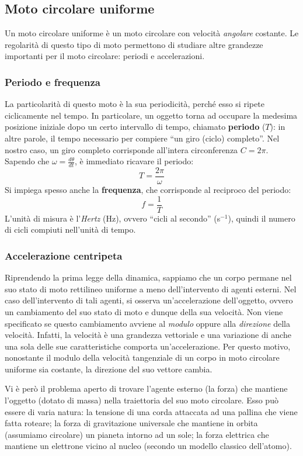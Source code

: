 \subsection{Moto circolare uniforme}
Un moto circolare uniforme è un moto circolare con velocità \textit{angolare} costante.
Le regolarità di questo tipo di moto permettono di studiare altre grandezze
importanti per il moto circolare: periodi e accelerazioni.

\subsubsection*{Periodo e frequenza}
La particolarità di questo moto è la sua periodicità, perché esso si ripete
ciclicamente nel tempo. In particolare, un oggetto torna ad occupare la medesima
posizione iniziale dopo un certo intervallo di tempo, chiamato \textbf{periodo} ($T$):
in altre parole, il tempo necessario per compiere ``un giro (ciclo) completo''.
Nel nostro caso, un giro completo corrisponde all'intera circonferenza $C = 2\pi$.
Sapendo che $\omega = \frac{d\theta}{dt}$, è immediato ricavare il periodo:
\[ T = \frac{2\pi}{\omega} \]
Si impiega spesso anche la \textbf{frequenza}, che corrisponde al reciproco
del periodo:
\[ f = \frac{1}{T} \]
L'unità di misura è l'\textit{Hertz} (Hz), ovvero ``cicli al secondo'' (s$^{-1}$),
quindi il numero di cicli compiuti nell'unità di tempo.

\subsubsection*{Accelerazione centripeta}
Riprendendo la prima legge della dinamica, sappiamo che un corpo permane nel
suo stato di moto rettilineo uniforme a meno dell'intervento di agenti esterni.
Nel caso dell'intervento di tali agenti, si osserva un'accelerazione
dell'oggetto, ovvero un cambiamento del suo stato di moto e dunque della sua
velocità. Non viene specificato se questo cambiamento avviene al \textit{modulo}
oppure alla \textit{direzione} della velocità. Infatti, la velocità è una
grandezza vettoriale e una variazione di anche una sola delle sue caratteristiche
comporta un'accelerazione. Per questo motivo, nonostante il modulo della velocità
tangenziale di un corpo in moto circolare uniforme sia costante, la direzione
del suo vettore cambia.

Vi è però il problema aperto di trovare l'agente esterno (la forza) che
mantiene l'oggetto (dotato di massa) nella traiettoria del suo moto circolare.
Esso può essere di varia natura: la tensione di una corda attaccata ad una
pallina che viene fatta roteare; la forza di gravitazione universale che
mantiene in orbita (assumiamo circolare) un pianeta intorno ad un sole; la forza
elettrica che mantiene un elettrone vicino al nucleo (secondo un modello classico
dell'atomo).

